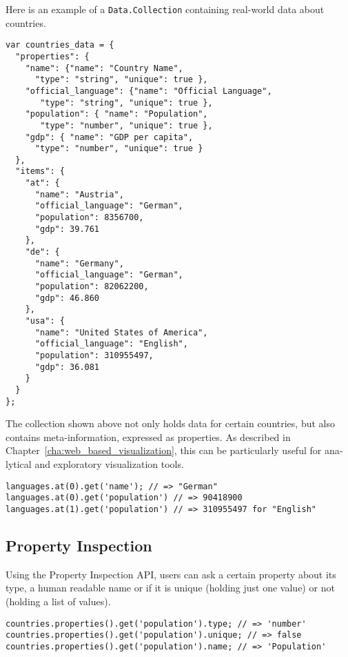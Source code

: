 \begin{english}
Here is an example of a \texttt{Data.Collection} containing real-world data about countries.

\begin{verbatim}
var countries_data = {
  "properties": {
    "name": {"name": "Country Name",
      "type": "string", "unique": true },
    "official_language": {"name": "Official Language",
       "type": "string", "unique": true },
    "population": { "name": "Population",
       "type": "number", "unique": true },
    "gdp": { "name": "GDP per capita",
      "type": "number", "unique": true }
  },
  "items": {
    "at": {
      "name": "Austria",
      "official_language": "German",
      "population": 8356700,
      "gdp": 39.761
    },
    "de": {
      "name": "Germany",
      "official_language": "German",
      "population": 82062200,
      "gdp": 46.860
    },
    "usa": {
      "name": "United States of America",
      "official_language": "English",
      "population": 310955497,
      "gdp": 36.081
    }
  }
};
\end{verbatim}

\SuperPar The collection shown above not only holds data for certain countries, but also contains meta-information, expressed as properties. As described in Chapter~\ref{cha:web_based_visualization}, this can be particularly useful for analytical and exploratory visualization tools. 

\begin{verbatim}
languages.at(0).get('name'); // => "German"
languages.at(0).get('population') // => 90418900
languages.at(1).get('population') // => 310955497 for "English"
\end{verbatim}

\subsection{Property Inspection}

Using the Property Inspection API, users can ask a certain property about its type, a human readable name or if it is unique (holding just one value) or not (holding a list of values).

\begin{verbatim}
countries.properties().get('population').type; // => 'number'
countries.properties().get('population').unique; // => false
countries.properties().get('population').name; // => 'Population'
\end{verbatim}


\end{english}
